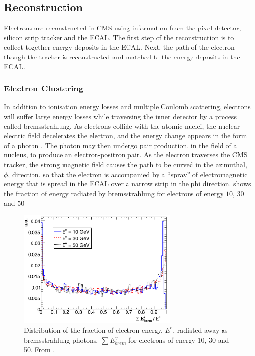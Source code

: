 \subsection{Reconstruction}
Electrons are reconstructed in CMS using information from the pixel detector,
silicon strip tracker and the ECAL.  The first step of the reconstruction is to
collect together energy deposits in the ECAL. Next, the path of the electron
though the tracker is reconstructed and matched to the energy deposits in the
ECAL\cite{baffioni2007electron,adam2009electron}.

\subsubsection{Electron Clustering}

In addition to ionisation energy losses and multiple Coulomb scattering,
electrons will suffer large energy losses while traversing the inner detector by
a process called bremsstrahlung.  As electrons collide with the atomic nuclei,
the nuclear electric field decelerates the electron, and the energy change
appears in the form of a photon \cite{perkins2000introduction}.  The photon may
then undergo pair production, in the field of a nucleus, to produce an
electron-positron pair.  As the electron traverses the CMS tracker, the strong
magnetic field causes the path to be curved in the azimuthal, $\phi$, direction,
so that the electron is accompanied by a ``spray'' of electromagnetic energy
that is spread in the ECAL over a narrow strip in the phi direction. 
 shows the fraction of energy radiated by bremsstrahlung for
electrons of energy $10$, $30$ and \unit{$50$}{\GeV}
\cite{baffioni2007electron}.

\begin{figure}[htbp]
  \centering
  \includegraphics[width=0.7\textwidth]{brem}
  \caption{Distribution of the fraction of electron energy, $E^{e}$, radiated away as bremsstrahlung
photons, $\sum E_{brem}^{\gamma}$ for electrons of energy 10, 30 and
\unit{50}{\GeV}. From \cite{baffioni2007electron}. } 
\label{fig:brem}
\end{figure}

